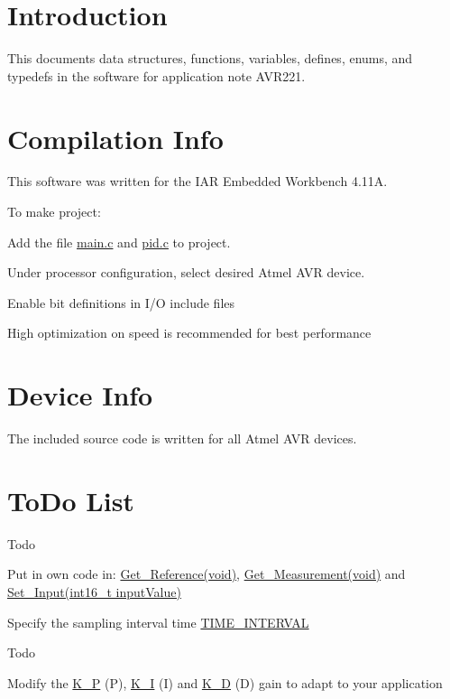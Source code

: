 \hypertarget{index_Intro}{}\section{Introduction}\label{index_Intro}
This documents data structures, functions, variables, defines, enums, and typedefs in the software for application note A\+V\+R221.\hypertarget{index_CI}{}\section{Compilation Info}\label{index_CI}
This software was written for the I\+AR Embedded Workbench 4.\+11A.

To make project\+: 
\begin{DoxyEnumerate}
\item Add the file \hyperlink{main_8c_source}{main.\+c} and \hyperlink{pid_8c}{pid.\+c} to project. 
\item Under processor configuration, select desired Atmel A\+VR device. 
\item Enable bit definitions in I/O include files 
\item High optimization on speed is recommended for best performance 
\end{DoxyEnumerate}\hypertarget{index_DI}{}\section{Device Info}\label{index_DI}
The included source code is written for all Atmel A\+VR devices.\hypertarget{index_TDL}{}\section{To\+Do List}\label{index_TDL}
\begin{DoxyRefDesc}{Todo}
\item[\hyperlink{todo__todo000005}{Todo}]Put in own code in\+: \hyperlink{pid__main_8c_a5d425d60c4c5cc27b85f5d91f3089b24}{Get\+\_\+\+Reference(void)}, \hyperlink{pid__main_8c_a6c21c2fcef2ac5b7bd483e1ca38f14e0}{Get\+\_\+\+Measurement(void)} and \hyperlink{pid__main_8c_a9890f9c197e2e87a8b187f2c4c821e7a}{Set\+\_\+\+Input(int16\+\_\+t input\+Value)} 

Specify the sampling interval time \hyperlink{pid__main_8c_a847b99b287f7c6555ab0f1cb4ed52119}{T\+I\+M\+E\+\_\+\+I\+N\+T\+E\+R\+V\+AL} \end{DoxyRefDesc}


\begin{DoxyRefDesc}{Todo}
\item[\hyperlink{todo__todo000006}{Todo}]Modify the \hyperlink{pid__main_8c_acfc98b8c69707c30ac9a96bb12f2a0ab}{K\+\_\+P} (P), \hyperlink{pid__main_8c_a5e606c8dc6de900bea3cd7740ac1bd4d}{K\+\_\+I} (I) and \hyperlink{pid__main_8c_a0b9e481775b5a7ecdd0dbb43cacc1a09}{K\+\_\+D} (D) gain to adapt to your application \end{DoxyRefDesc}

